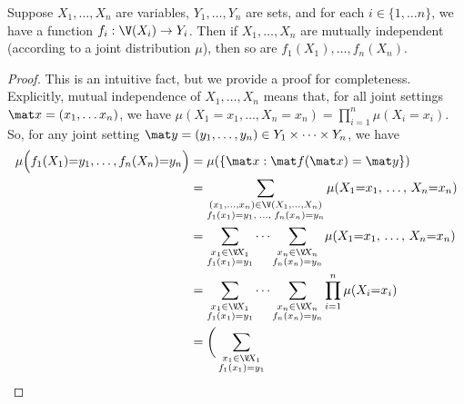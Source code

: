 \begin{subappendices}
\begin{lemma} \label{lem:indep-fun}
    Suppose $X_1, \ldots, X_n$ are variables, $Y_1, \ldots, Y_n$ are sets,
        and for each $i \in \{1, \ldots n\}$, we have a function
        $f_i : \V (X_i) \to Y_i$.
    Then if $X_1, \ldots, X_n$ are mutually independent (according to a
        joint distribution $\mu$), then
    so are $f_1(X_1), \ldots, f_n(X_n)$.
\end{lemma}
\begin{proof}
    This is an intuitive fact, but we provide a
    proof for completeness.
    Explicitly, mutual independence of $X_1, \ldots, X_n$ means that,
        for all joint settings $\mat x = (x_1, \ldots x_n)$,
    we have $\mu(X_1{=}x_1,\ldots,X_n{=}x_n) = \prod_{i=1}^n \mu(X_i{=}x_i)$.
    So, for any joint setting $\mat y = (y_1, \ldots, y_n) \in Y_1 \times \cdots \times Y_n$, we have
    \begin{align*}
        \mu\Big(f_1(X_1){=}y_1, \ldots, f_n(X_n){=}y_n\Big)
            &= \mu(\{ \mat x : \mat f(\mat x) = \mat y\}) \\
            &= \sum_{\substack{(x_1,\ldots, x_n) \in \V(X_1,\ldots,X_n) \\ f_1(x_1) = y_1,\; \ldots,\; f_n(x_n) = y_n}}
                \mu(X_1{=}x_1, \,\ldots,\, X_n{=}x_n) \\
            &= \sum_{\substack{x_1 \in \V\! X_1 \\ f_1(x_1) = y_1}}
                    \cdots
                \sum_{\substack{x_n \in \V\! X_n \\ f_n(x_n) = y_n}}
                \mu(X_1{=}x_1, \,\ldots,\, X_n{=}x_n) \\
            &= \sum_{\substack{x_1 \in \V\! X_1 \\ f_1(x_1) = y_1}}
                    \cdots
                \sum_{\substack{x_n \in \V\! X_n \\ f_n(x_n) = y_n}}
                \prod_{i=1}^n \mu(X_i{=}x_i) \\
            &= \bigg(\sum_{\substack{x_1 \in \V\! X_1 \\ f_1(x_1) = y_1}}

\end{align*}
\end{proof}
\end{subappendices}
